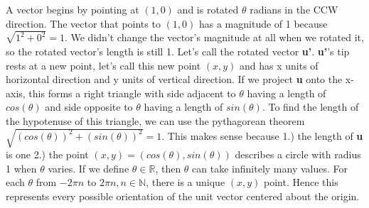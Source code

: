 \documentclass[12pt]{article}
\begin{document}
\noindent A vector begins by pointing at $(1, 0)$ and is rotated $\theta$ radians in the CCW direction. The vector that points to $(1, 0)$ 
has a magnitude of 1 because $\sqrt{1^{2} + 0^{2}} = 1$. We didn't change the vector's magnitude at all when we rotated it, so the 
rotated vector's length is still 1. Let's call the rotated vector \textbf{u'}. \textbf{u'}'s tip rests at a new point, let's call this new point $(x, y)$ and has
x units of horizontal direction and y units of vertical direction. 
If we project \textbf{u} onto the x-axis, this forms a right triangle with 
side adjacent to $\theta$ having a length of $cos(\theta)$ and side opposite to $\theta$ having a length of $sin(\theta)$.
To find the length of the hypotenuse of this triangle, we can use the pythagorean theorem $\sqrt{(cos(\theta))^{2} + (sin(\theta))^{2}} = 1$.
This makes sense because 1.) the length of \textbf{u} is one 2.) the point $(x,y) = (cos(\theta), sin(\theta))$ describes a circle with radius 1 when $\theta$ varies.
If we define $\theta \in \mathbb{R}$, then $\theta$ can take infinitely many values.
For each $\theta$ from $-2\pi n$ to $2\pi n , n \in \mathbb{N}$, there is a unique $(x, y)$ point.
Hence this represents every possible orientation of the unit vector centered about the origin.\\\\
\end{document}
